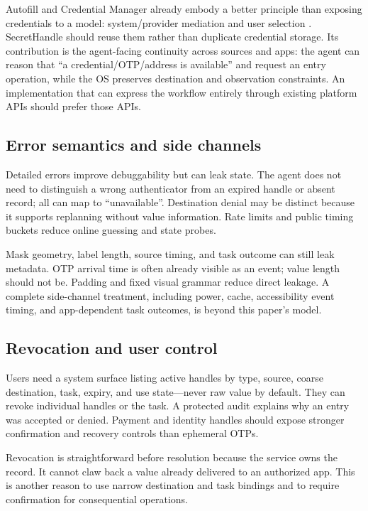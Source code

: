 Autofill and Credential Manager already embody a better principle than exposing credentials to a model: system/provider mediation and user selection \cite{androidAutofill,androidCredentialManager}. SecretHandle should reuse them rather than duplicate credential storage. Its contribution is the agent-facing continuity across sources and apps: the agent can reason that ``a credential/OTP/address is available'' and request an entry operation, while the OS preserves destination and observation constraints. An implementation that can express the workflow entirely through existing platform APIs should prefer those APIs.

\subsection{Error semantics and side channels}

Detailed errors improve debuggability but can leak state. The agent does not need to distinguish a wrong authenticator from an expired handle or absent record; all can map to ``unavailable''. Destination denial may be distinct because it supports replanning without value information. Rate limits and public timing buckets reduce online guessing and state probes.

Mask geometry, label length, source timing, and task outcome can still leak metadata. OTP arrival time is often already visible as an event; value length should not be. Padding and fixed visual grammar reduce direct leakage. A complete side-channel treatment, including power, cache, accessibility event timing, and app-dependent task outcomes, is beyond this paper's model.

\subsection{Revocation and user control}

Users need a system surface listing active handles by type, source, coarse destination, task, expiry, and use state---never raw value by default. They can revoke individual handles or the task. A protected audit explains why an entry was accepted or denied. Payment and identity handles should expose stronger confirmation and recovery controls than ephemeral OTPs.

Revocation is straightforward before resolution because the service owns the record. It cannot claw back a value already delivered to an authorized app. This is another reason to use narrow destination and task bindings and to require confirmation for consequential operations.

